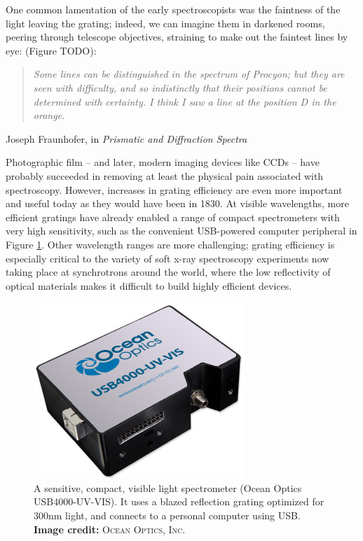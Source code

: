 One common lamentation of the early spectroscopists was the faintness of the light leaving the grating; indeed, we can imagine them in darkened rooms, peering through telescope objectives,  straining to make out the faintest lines by eye: (Figure TODO):
\begin{quote}
\emph{Some lines can be distinguished in the spectrum of \emph{Procyon}; but they are seen with difficulty, and so indistinctly that their positions cannot be determined with certainty.  I \emph{think} I saw a line at the position D in the orange.}
\end{quote}
\begin{flushright}
Joseph Fraunhofer, in \emph{Prismatic and Diffraction Spectra} \cite[p.~61]{Fra98}
\end{flushright}

Photographic film -- and later, modern imaging devices like CCDs --  have probably succeeded in removing at least the physical pain associated with spectroscopy.  However, increases in grating efficiency are even more important and useful today as they would have been in 1830.  At visible wavelengths, more efficient gratings have already enabled a range of compact spectrometers with very high sensitivity, such as the convenient USB-powered computer peripheral in Figure \ref{1a}.  Other wavelength ranges are more challenging; grating efficiency is especially critical to the variety of soft x-ray spectroscopy experiments now taking place at synchrotrons around the world, where the low reflectivity of optical materials makes it difficult to build highly efficient devices.

\begin{figure}[htbp] %
   \centering
   \includegraphics[scale=0.5]{../data/Chapter1/1a_oceanOptics/1a.jpg} 
   \caption[A sensitive, compact, visible light spectrometer (Ocean Optics USB4000-UV-VIS).]{A sensitive, compact, visible light spectrometer (Ocean Optics USB4000-UV-VIS).  It uses a blazed reflection grating optimized for 300nm light, and connects to a personal computer using USB.  \textbf{Image credit: }\textsc{Ocean Optics, Inc.} \cite{Oce11}}
   \label{1a}
\end{figure}

